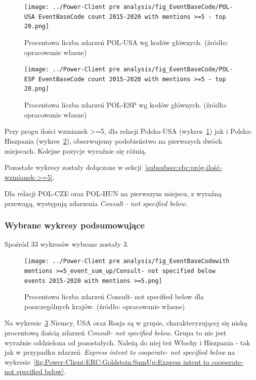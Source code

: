 \documentclass[11pt]{report}
\begin{document}
    \begin{figure}[!htp]
        \centering
        \texttt{[image: ../Power-Client pre analysis/fig\_EventBaseCode/POL-USA EventBaseCode count 2015-2020 with mentions >=5 - top 20.png]}
        \caption{Procentowa liczba zdarzeń POL-USA wg kodów głównych. (źródło: opracowanie własne)}
        \label{fig:Power-Client:EBC:Mentions:POL-USA}
    \end{figure}

    \begin{figure}[!htp]
        \centering
        \texttt{[image: ../Power-Client pre analysis/fig\_EventBaseCode/POL-ESP EventBaseCode count 2015-2020 with mentions >=5 - top 20.png]}
        \caption{Procentowa liczba zdarzeń POL-ESP wg kodów głównych. (źródło: opracowanie własne)}
        \label{fig:Power-Client:EBC:Mentions:POL-ESP}
    \end{figure}

    Przy progu ilości wzmianek >=5, dla relacji Polska-USA (wykres~\ref{fig:Power-Client:EBC:Mentions:POL-USA}) jak i Polska-Hiszpania (wykres~\ref{fig:Power-Client:EBC:Mentions:POL-ESP}),
    obserwujemy podobieństwo na pierwszych dwóch miejscach.
    Kolejne pozycje wyraźnie się różnią.

    Pozostałe wykresy zostały dołączone w sekcji~\ref{subsubsec:ebc:próg-ilość-wzmianek->=5}.

    Dla relacji POL-CZE oraz POL-HUN na pierwszym miejscu, z wyraźną przewagą, występują zdarzenia \textit{Consult - not specified below}.

    \subsubsection{Wybrane wykresy podsumowujące}

    Spośród 33 wykresów wybrane zostały 3.

    \begin{figure}[!htp]
        \centering
        \texttt{[image: ../Power-Client pre analysis/fig\_EventBaseCodewith mentions >=5\_event\_sum\_up/Consult- not specified below events 2015-2020 with mentions >=5.png]}
        \caption{Procentowa liczba zdarzeń Consult- not specified below dla poszczególnych krajów. (źródło: opracowanie własne)}
        \label{fig:Power-Client:ERC:Mentions:SumUp:Consult- not specified below}
    \end{figure}
    Na wykresie~\ref{fig:Power-Client:ERC:Mentions:SumUp:Consult- not specified below} Niemcy, USA oraz Rosja są w grupie,
    charakteryzującej się niską procentową ilością zdarzeń \textit{Consult- not specified below}.
    Grupa to nie jest wyraźnie oddzielona od pozostałych.
    Należą do niej też Włochy i Hiszpania - tak jak w przypadku zdarzeń~\textit{Express intent to cooperate- not specified below}
    na wykresie~\ref{fig:Power-Client:ERC:Goldstein:SumUp:Express intent to cooperate- not specified below}.
\end{document}
